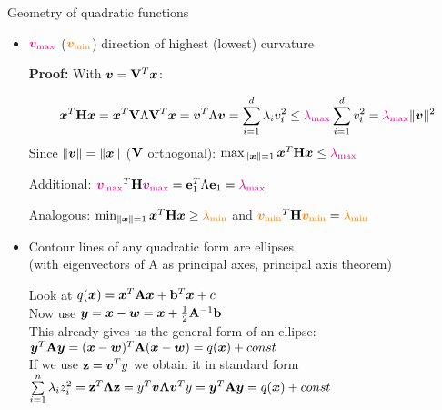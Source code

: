 \documentclass[11pt,compress,t,notes=noshow, xcolor=table]{beamer}
\begin{document}
\begin{vbframe}{Geometry of quadratic functions}
\framebreak
    
\begin{itemize}
    \item $\textcolor{magenta}{\bm{v}_\text{max}}$ ($\textcolor{orange}{\bm{v}_\text{min}}$) direction of highest (lowest) curvature

        \vspace{0.25\baselineskip}
    
        \begin{footnotesize}
            \textbf{Proof:} With $\bm{v}=\mathbf{V}^T\bm{x}$:

            \vspace{-\baselineskip}
            
            \begin{equation*}
                \bm{x}^T \mathbf{H} \bm{x} = \bm{x}^T\mathbf{V}\Lambda\mathbf{V}^T\bm{x} = \bm{v}^T\Lambda\bm{v} = \sum_{i=1}^d \lambda_iv_i^2 \leq \textcolor{magenta}{\lambda_\text{max}} \sum_{i=1}^d v_i^2 = \textcolor{magenta}{\lambda_\text{max}}\|\bm{v}\|^2
            \end{equation*}
            Since $\|\bm{v}\| = \|\bm{x}\|$ ($\mathbf{V}$ orthogonal): $\max_{\|\bm{x}\|=1} \bm{x}^T \mathbf{H} \bm{x} \leq \textcolor{magenta}{\lambda_\text{max}}$
            
            Additional: $\textcolor{magenta}{\bm{v}_\text{max}}^T \mathbf{H} \textcolor{magenta}{\bm{v}_\text{max}} = \mathbf{e}_1^T\Lambda\mathbf{e}_1 = \textcolor{magenta}{\lambda_\text{max}}$

            Analogous: $\min_{\|\bm{x}\|=1} \bm{x}^T \mathbf{H} \bm{x} \geq \textcolor{orange}{\lambda_\text{min}}$ and $\textcolor{orange}{\bm{v}_\text{min}}^T \mathbf{H} \textcolor{orange}{\bm{v}_\text{min}} = \textcolor{orange}{\lambda_\text{min}}$
        \end{footnotesize}

    \medskip

    \item Contour lines of any quadratic form are ellipses \\
    (with eigenvectors of A as principal axes, principal axis theorem)
        \vspace{0.25\baselineskip}
    
        \begin{footnotesize}
        Look at $q(\bm{x}) = \bm{x}^T \mathbf{A} \bm{x} + \mathbf{b}^T \bm{x} + c$ \\
        Now use $\bm{y} = \bm{x} - \bm{w} = \bm{x} + \frac{1}{2} \mathbf{A}^{-1} \mathbf{b}$\\
        This already gives us the general form of an ellipse:\\
        $\bm{y}^T \mathbf{A} \bm{y} = (\bm{x}-\bm{w})^T \mathbf{A} (\bm{x}-\bm{w}) = q(\bm{x}) + const$\\
        If we use $\mathbf{z} = \bm{v}^T y$ we obtain it in standard form\\
        $\sum\limits_{i=1}^n \lambda_i z_i^2 = \mathbf{z}^T \bm{\Lambda} \mathbf{z} = y^T \bm{v} \bm{\Lambda} \bm{v}^T y = \bm{y}^T \mathbf{A} \bm{y} = q(\bm{x}) + const $
        \end{footnotesize}


\end{itemize}
\end{vbframe}
\end{document}
